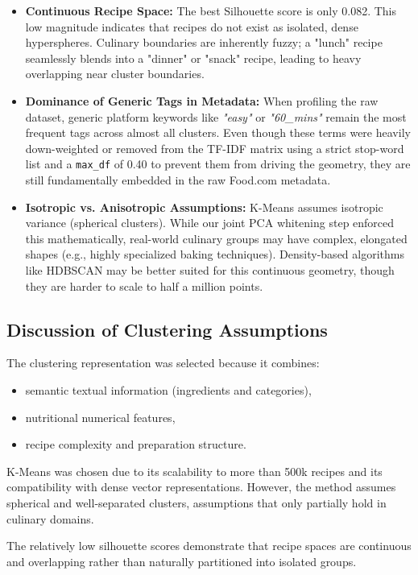 \documentclass[11pt,a4paper]{article}
\begin{document}
\begin{itemize}
    \item \textbf{Continuous Recipe Space:} The best Silhouette score is only 0.082. This low magnitude indicates that recipes do not exist as isolated, dense hyperspheres. Culinary boundaries are inherently fuzzy; a "lunch" recipe seamlessly blends into a "dinner" or "snack" recipe, leading to heavy overlapping near cluster boundaries.
    \item \textbf{Dominance of Generic Tags in Metadata:} When profiling the raw dataset, generic platform keywords like \textit{"easy"} or \textit{"60\_mins"} remain the most frequent tags across almost all clusters. Even though these terms were heavily down-weighted or removed from the TF-IDF matrix using a strict stop-word list and a \texttt{max\_df} of 0.40 to prevent them from driving the geometry, they are still fundamentally embedded in the raw Food.com metadata.
    \item \textbf{Isotropic vs. Anisotropic Assumptions:} K-Means assumes isotropic variance (spherical clusters). While our joint PCA whitening step enforced this mathematically, real-world culinary groups may have complex, elongated shapes (e.g., highly specialized baking techniques). Density-based algorithms like HDBSCAN may be better suited for this continuous geometry, though they are harder to scale to half a million points.
\end{itemize}

\subsection{Discussion of Clustering Assumptions}

The clustering representation was selected because it combines:
\begin{itemize}
    \item semantic textual information (ingredients and categories),
    \item nutritional numerical features,
    \item recipe complexity and preparation structure.
\end{itemize}

K-Means was chosen due to its scalability to more than 500k recipes and its compatibility with dense vector representations. However, the method assumes spherical and well-separated clusters, assumptions that only partially hold in culinary domains.

The relatively low silhouette scores demonstrate that recipe spaces are continuous and overlapping rather than naturally partitioned into isolated groups.
\end{document}
